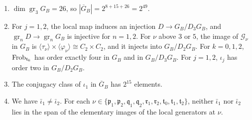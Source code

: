 \begin{lemma}\label{tw:retained-quotient}
\begin{enumerate}
\item[(a)] $\dim\operatorname{gr}_3G_B=26$, so $|\overline G_B|=2^{8+15+26}=2^{49}$.
\item[(b)] For $j=1,2$, the local map induces an injection
 $D\to G_B/D_3G_B$, and $\operatorname{gr}_nD\to\operatorname{gr}_nG_B$ is
 injective for $n=1,2$. For $\nu$ above $3$ or $5$, the image of
 $\mathcal G_\nu$ in $G_B$ is
 $\langle\tau_\nu\rangle\times\langle\varphi_\nu\rangle\cong C_2\times C_2$,
 and it injects into $G_B/D_2G_B$. For $k=0,1,2$, $\operatorname{Frob}_{\mathfrak t_k}$ has
 order exactly four in $G_B$ and in $G_B/D_3G_B$. For $j=1,2$, $\iota_j$ has
 order two in $G_B/D_2G_B$.
\item[(c)] The conjugacy class of $\iota_1$ in $\overline G_B$ has $2^{15}$
 elements.
\item[(d)] We have $\bar\iota_1\ne\bar\iota_2$. For each
 $\nu\in\{\mathfrak p_1,\mathfrak p_2,\mathfrak q_1,\mathfrak q_2,\mathfrak r_1,\mathfrak r_2,\mathfrak t_0,\mathfrak t_1,\mathfrak t_2\}$,
 neither $\bar\iota_1$ nor $\bar\iota_2$ lies in the span of the elementary
 images of the local generators at $\nu$.
\end{enumerate}
\end{lemma}

